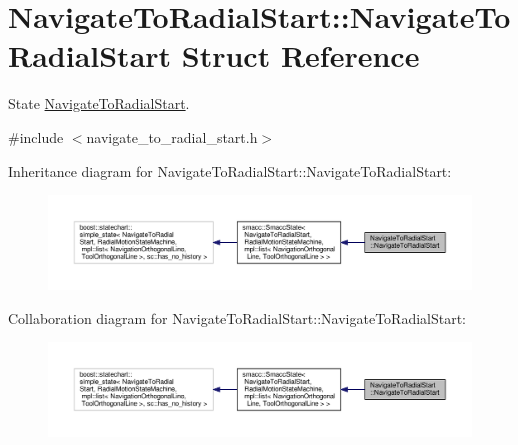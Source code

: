 \hypertarget{structNavigateToRadialStart_1_1NavigateToRadialStart}{\section{Navigate\-To\-Radial\-Start\-:\-:Navigate\-To\-Radial\-Start Struct Reference}
\label{structNavigateToRadialStart_1_1NavigateToRadialStart}
}


State \hyperlink{structNavigateToRadialStart_1_1NavigateToRadialStart}{Navigate\-To\-Radial\-Start}.  




{\ttfamily \#include $<$navigate\-\_\-to\-\_\-radial\-\_\-start.\-h$>$}



Inheritance diagram for Navigate\-To\-Radial\-Start\-:\-:Navigate\-To\-Radial\-Start\-:
\nopagebreak
\begin{figure}[H]
\begin{center}
\leavevmode
\includegraphics[width=350pt]{structNavigateToRadialStart_1_1NavigateToRadialStart__inherit__graph}
\end{center}
\end{figure}


Collaboration diagram for Navigate\-To\-Radial\-Start\-:\-:Navigate\-To\-Radial\-Start\-:
\nopagebreak
\begin{figure}[H]
\begin{center}
\leavevmode
\includegraphics[width=350pt]{structNavigateToRadialStart_1_1NavigateToRadialStart__coll__graph}
\end{center}
\end{figure}
